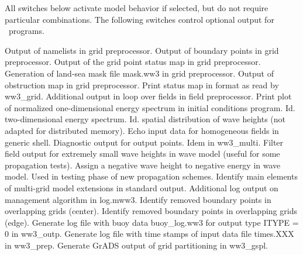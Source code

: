 All switches below activate model behavior if selected, but do not require
particular combinations. The following switches control optional output for
\ws\ programs.

\begin{slist}
  {Output of namelists in grid preprocessor.}
  {Output of boundary points in grid preprocessor.}
  {Output of the grid point status map in grid preprocessor.} 
 {Generation of land-sea mask file {\file mask.ww3} in grid
           preprocessor.}
 {Output of obstruction map in grid preprocessor.}
 {Print status map in format as read by {\file ww3\_grid}.}
  {Additional output in loop over fields in field preprocessor.}
  {Print plot of normalized one-dimensional energy
           spectrum in initial conditions program.}
  {Id. two-dimensional energy spectrum.}
  {Id. spatial distribution of wave heights (not adapted for 
           distributed memory).}
  {Echo input data for homogeneous fields in generic shell.}
 {Diagnostic output for output points.}
 {Idem in {\file ww3\_multi}.}
  {Filter field output for extremely small wave heights
           in wave model (useful for some propagation tests).}
  {Assign a negative wave height to negative energy in wave model.
           Used in testing phase of new propagation schemes.}
 {Identify main elements of multi-grid model extensions in
           standard output.}
 {Additional log output on management algorithm in {\file log.mww3}.}
 {Identify removed boundary points in overlapping grids (center).}
 {Identify removed boundary points in overlapping grids (edge).}
 {Generate log file with buoy data {\file buoy\_log.ww3} for output
           type {\code ITYPE = 0} in {\file ww3\_outp}.}
 {Generate log file with time stamps of input data file {\file
           times.XXX} in {\file ww3\_prep}.}
 {Generate GrADS output of grid partitioning in {\file ww3\_gspl}.}
\end{slist}

